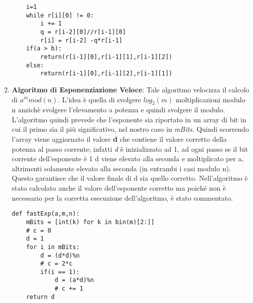 \documentclass{article}
\begin{document}
\begin{enumerate}
\begin{lstlisting}
    i=1
    while r[i][0] != 0:
        i += 1
        q = r[i-2][0]//r[i-1][0]
        r[i] = r[i-2] -q*r[i-1]
    if(a > b):
        return(r[i-1][0],r[i-1][1],r[i-1][2])
    else:
        return(r[i-1][0],r[i-1][2],r[i-1][1])

    \end{lstlisting}
    
    \item \textbf{Algoritmo di Esponenziazione Veloce}: Tale algoritmo velocizza il calcolo di $a^m mod(n)$. L'idea è quella di svolgere $log_2(m)$ moltiplicazioni modulo n anzichè svolgere l'elevamento a potenza e quindi svolgere il modulo. L'algoritmo quindi prevede che l'esponente sia riportato in un array di bit in cui il primo sia il più significativo, nel nostro caso in \textit{mBits}. Quindi scorrendo l'array viene aggiornato il valore \textbf{d} che contiene il valore corretto della potenza al passo corrente; infatti \textit{d} è inizializzato ad 1, ad ogni passo se il bit corrente dell'esponente è 1 d viene elevato alla seconda e moltiplicato per a, altrimenti solamente elevato alla seconda (in entrambi i casi modulo n). Questo garantisce che il valore finale di d sia quello corretto. Nell'algoritmo è stato calcolato anche il valore dell'esponente corretto ma poiché non è necessario per la corretta esecuzione dell'algoritmo, è stato commentato.
    \begin{lstlisting}
def fastExp(a,m,n):
    mBits = [int(k) for k in bin(m)[2:]]
    # c = 0
    d = 1
    for i in mBits:
        d = (d*d)%n
        # c = 2*c
        if(i == 1):
            d = (a*d)%n
            # c += 1
    return d
    \end{lstlisting}
    

\end{enumerate}
\end{document}
